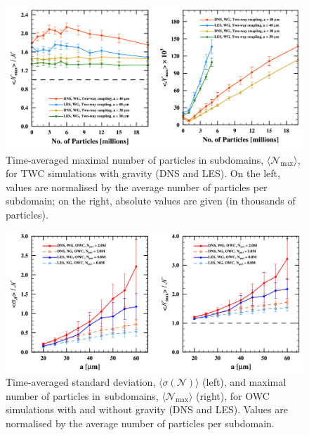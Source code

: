 \begin{figure}
\centering
\includegraphics[width=13.5cm]{figures/3-16_pfptwc.pdf}
\caption{
Time-averaged maximal number of particles in subdomains, $\langle \mathcal{N}_{\max} \rangle$, for TWC simulations with gravity (DNS and LES).
On the left, values are normalised by the average number of particles per subdomain; on the right, absolute values are given (in thousands of particles).
}
\label{fig:pfptwc}
\end{figure}


\begin{figure}
\centering
\includegraphics[width=13.5cm]{figures/3-17_pfpowc.pdf}
\caption{
Time-averaged standard deviation, $\langle \sigma(\mathcal{N}) \rangle$ (left), and maximal number of particles in~subdomains, $\langle \mathcal{N}_{\max} \rangle$ (right), for OWC simulations with and without gravity (DNS and LES).
Values are normalised by the average number of particles per subdomain.
}
\label{fig:pfpowc}
\end{figure}
    

